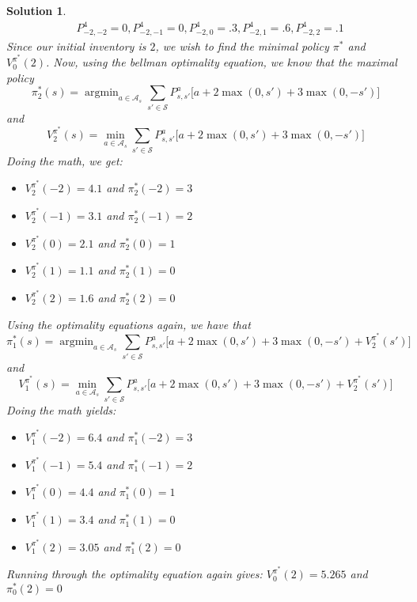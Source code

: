 \documentclass[12pt]{amsart}
\newtheorem{sol}[thm]{Solution}
\newcommand{\MA}{\mathcal{A}}
\newcommand{\MS}{\mathcal{S}}
\DeclareMathOperator*{\argmin}{argmin}
\begin{document}
\begin{sol}
\begin{align*}
&P^4_{-2,-2} = 0, P^4_{-2,-1} = 0, P^4_{-2,0} = .3, P^4_{-2,1} = .6, P^4_{-2,2} = .1 
\end{align*}
Since our initial inventory is $2$, we wish to find the minimal policy $\pi^*$ and $V^{\pi^*}_0(2)$. Now, using the bellman optimality equation, we know that the maximal policy $$\pi^*_2(s) = \argmin_{a \in \MA_s} \sum_{s' \in \MS} P^a_{s,s'} \bigg[ a + 2\max(0, s')+3\max(0,-s')\bigg]$$ and $$ V^{\pi^*}_{2}(s) = \min_{a \in \MA_s} \sum_{s' \in \MS} P^a_{s,s'} \bigg[ a + 2\max(0, s')+3\max(0,-s')\bigg]$$
\newpage
Doing the math, we get:
\begin{itemize}
\item $V^{\pi^*}_{2}(-2) = 4.1$ and $\pi^*_2(-2) = 3$
\item $V^{\pi^*}_{2}(-1) = 3.1$ and $\pi^*_2(-1) = 2$
\item $V^{\pi^*}_{2}(0) = 2.1$ and $\pi^*_2(0) = 1$
\item $V^{\pi^*}_{2}(1) = 1.1$ and $\pi^*_2(1) = 0$
\item $V^{\pi^*}_{2}(2) = 1.6$ and $\pi^*_2(2) = 0$
\end{itemize}
Using the optimality equations again, we have that
$$\pi^*_1(s) = \argmin_{a \in \MA_s} \sum_{s' \in \MS} P^a_{s,s'} \bigg[ a + 2\max(0, s')+3\max(0,-s')+ V^{\pi^*}_{2}(s')\bigg]$$
and $$V^{\pi^*}_{1}(s) = \min_{a \in \MA_s} \sum_{s' \in \MS} P^a_{s,s'} \bigg[ a + 2\max(0, s')+3\max(0,-s') + V^{\pi^*}_{2}(s')\bigg]$$
Doing the math yields:
\begin{itemize}
\item $V^{\pi^*}_{1}(-2) = 6.4$ and $\pi^*_1(-2) = 3$
\item $V^{\pi^*}_{1}(-1) = 5.4$ and $\pi^*_1(-1) = 2$
\item $V^{\pi^*}_{1}(0) = 4.4$ and $\pi^*_1(0) = 1$
\item $V^{\pi^*}_{1}(1) = 3.4$ and $\pi^*_1(1) = 0$
\item $V^{\pi^*}_{1}(2) = 3.05$ and $\pi^*_1(2) = 0$
\end{itemize}
Running through the optimality equation again gives: $V_0^{\pi^*}(2) = 5.265$ and $\pi^*_0(2) = 0$
\end{sol}
\end{document}
